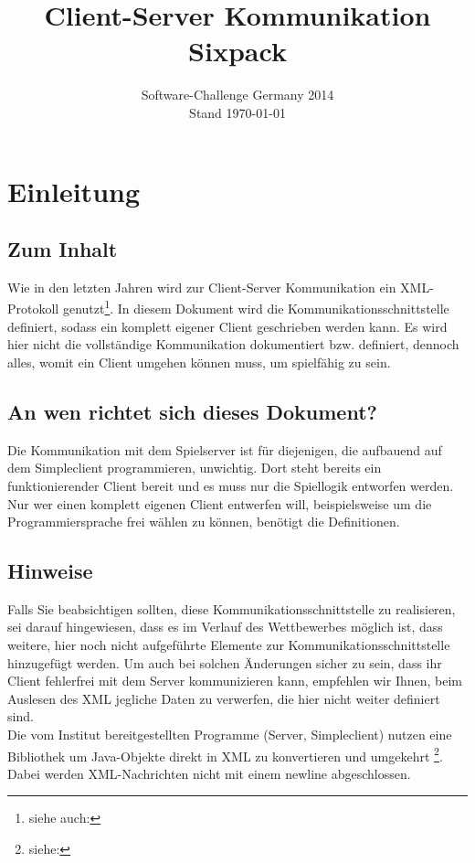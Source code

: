 \documentclass[12pt,a4paper, ngerman, oneside]{scrartcl}
\date{Software-Challenge Germany 2014\\Stand \today}
\title{Client-Server Kommunikation Sixpack}
\begin{document}
\maketitle
\thispagestyle{empty}
\tableofcontents
\thispagestyle{empty}
\newpage
\setcounter{page}{1}
\section{Einleitung}
\subsection*{Zum Inhalt} Wie in den letzten Jahren wird zur Client-Server
Kommunikation ein XML-Protokoll genutzt\footnote{siehe auch:
}. In diesem
Dokument wird die Kommunikationsschnittstelle definiert, sodass ein komplett
eigener Client geschrieben werden kann. Es wird hier nicht die vollständige
Kommunikation dokumentiert bzw. definiert, dennoch alles, womit ein Client
umgehen können muss, um spielfähig zu sein.
\subsection*{An wen richtet sich dieses Dokument?} Die Kommunikation mit dem
Spielserver ist für diejenigen, die aufbauend auf dem Simpleclient
programmieren, unwichtig. Dort steht bereits ein funktionierender Client bereit
und es muss nur die Spiellogik entworfen werden. \\
Nur wer einen komplett eigenen Client entwerfen will, beispielsweise um die
Programmiersprache frei wählen zu können, benötigt die Definitionen.

\subsection*{Hinweise} Falls Sie beabsichtigen sollten, diese
Kommunikationsschnittstelle zu realisieren, sei darauf hingewiesen, dass es im
Verlauf des Wettbewerbes möglich ist, dass weitere, hier noch nicht aufgeführte
Elemente zur Kommunikationsschnittstelle hinzugefügt werden. Um auch bei solchen
Änderungen sicher zu sein, dass ihr Client fehlerfrei mit dem Server
kommunizieren kann, empfehlen wir Ihnen, beim Auslesen des XML jegliche Daten zu
verwerfen, die hier nicht weiter definiert sind. \bigskip \\
Die vom Institut bereitgestellten Programme (Server, Simpleclient) nutzen eine
Bibliothek um Java-Objekte direkt in XML zu konvertieren und umgekehrt \footnote{siehe: }. 
Dabei werden XML-Nachrichten nicht mit einem newline abgeschlossen.
\end{document}
